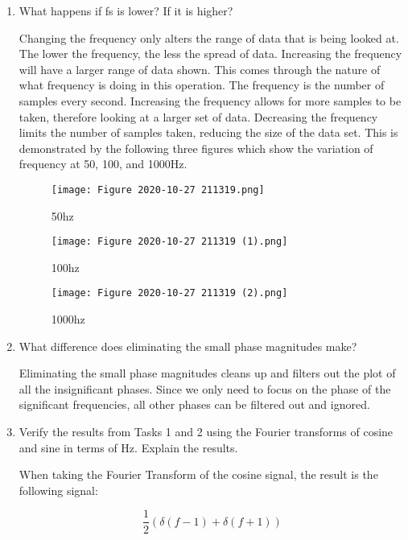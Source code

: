 \documentclass[12pt, titlepage]{article}
\begin{document}
    \begin{enumerate}
        \item What happens if fs is lower? If it is higher?
        
        Changing the frequency only alters the range of data that is being looked at.  The lower the frequency, the less the spread of data.  Increasing the frequency will have a larger range of data shown.  This comes through the nature of what frequency is doing in this operation.  The frequency is the number of samples every second.  Increasing the frequency allows for more samples to be taken, therefore looking at a larger set of data.  Decreasing the frequency limits the number of samples taken, reducing the size of the data set.  This is demonstrated by the following three figures which show the variation of frequency at 50, 100, and 1000Hz.
        
        \begin{figure}[h!]
            \centering
            \texttt{[image: Figure 2020-10-27 211319.png]}
            \caption{50hz}
            \label{50Hz}
        \end{figure}
        \begin{figure}[h!]
            \centering
            \texttt{[image: Figure 2020-10-27 211319 (1).png]}
            \caption{100hz}
            \label{50Hz}
        \end{figure}
        \begin{figure}[h!]
            \centering
            \texttt{[image: Figure 2020-10-27 211319 (2).png]}
            \caption{1000hz}
            \label{50Hz}
        \end{figure}
        \clearpage
        \item What difference does eliminating the small phase magnitudes make?
        
        Eliminating the small phase magnitudes cleans up and filters out the plot of all the insignificant phases.  Since we only need to focus on the phase of the significant frequencies, all other phases can be filtered out and ignored.
        
        \item Verify the results from Tasks 1 and 2 using the Fourier transforms of cosine and sine in terms of Hz.  Explain the results.
        
        When taking the Fourier Transform of the cosine signal, the result is the following signal:
        
        \begin{equation}
            \nonumber
            \frac{1}{2}(\delta(f-1)+\delta(f+1))
        \end{equation}
        

\end{enumerate}
\end{document}
